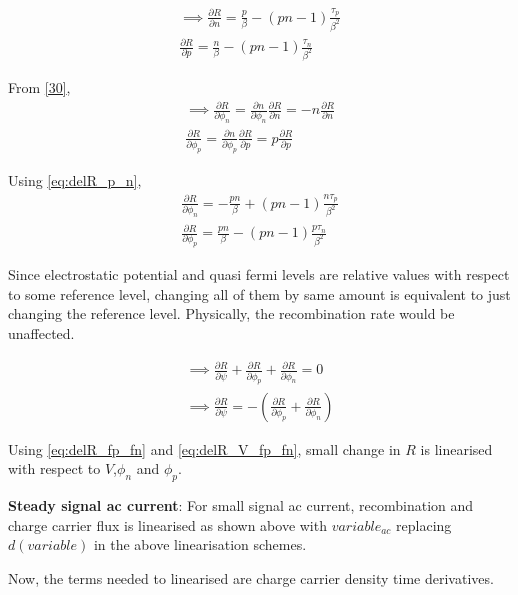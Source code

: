 \begin{align*}
\implies \frac{\partial R}{\partial n} =  \frac{p}{\beta} - (pn-1)\frac{\tau_p}{\beta^2} \\
\frac{\partial R}{\partial p} = \frac{n}{\beta} - (pn-1)\frac{\tau_n}{\beta^2} \tag{2.13} \label{eq:delR_p_n}
\end{align*}

From \eqref{30},
\begin{align*}
\implies \frac{\partial R}{\partial \phi_n} =  \frac{\partial n}{\partial \phi_n} \frac{\partial R}{\partial n} = -n \frac{\partial R}{\partial n} \\
\frac{\partial R}{\partial \phi_p} =  \frac{\partial n}{\partial \phi_p} \frac{\partial R}{\partial p} = p \frac{\partial R}{\partial p} 
\end{align*}

Using \eqref{eq:delR_p_n},
\begin{align*}
\frac{\partial R}{\partial \phi_n} = - \frac{pn}{\beta} + (pn-1)\frac{n\tau_p}{\beta^2} \\
\frac{\partial R}{\partial \phi_p} =  \frac{pn}{\beta} - (pn-1)\frac{p\tau_n}{\beta^2} \tag{2.14} \label{eq:delR_fp_fn}
\end{align*}

Since electrostatic potential and quasi fermi levels are relative values with respect to some reference level, changing all of them by same amount is equivalent to just changing the reference level. Physically, the recombination rate would be unaffected.

\begin{align*}
\implies \frac{\partial R}{\partial \psi} + \frac{\partial R}{\partial \phi_p} + \frac{\partial R}{\partial \phi_n} = 0 \\
\implies \frac{\partial R}{\partial \psi} = - \left(\frac{\partial R}{\partial \phi_p} + \frac{\partial R}{\partial \phi_n}\right)
\tag{2.15} \label{eq:delR_V_fp_fn}
\end{align*}

Using \eqref{eq:delR_fp_fn} and \eqref{eq:delR_V_fp_fn}, small change in $R$ is linearised with respect to $V$,$\phi_n$ and $\phi_p$.

\textbf{Steady signal ac current}:
For small signal ac current, recombination and charge carrier flux is linearised as shown above with $variable_{ac}$ replacing $d(variable)$ in the above linearisation schemes.

Now, the terms needed to linearised are charge carrier density time derivatives.

